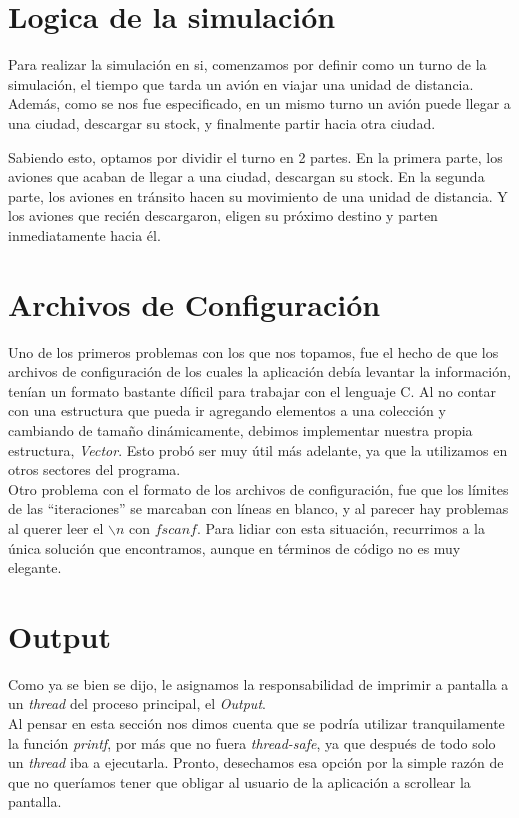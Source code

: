\documentclass[a4paper,10pt]{article}
\begin{document}
\newpage
\section{Logica de la simulación}
Para realizar la simulación en si, comenzamos por definir como un turno de la simulación, el tiempo que tarda un avión en viajar una unidad de distancia.
Además, como se nos fue especificado, en un mismo turno un avión puede llegar a una ciudad, descargar su stock, y finalmente partir hacia otra ciudad.

Sabiendo esto, optamos por dividir el turno en 2 partes.
En la primera parte, los aviones que acaban de llegar a una ciudad, descargan su stock.
En la segunda parte, los aviones en tránsito hacen su movimiento de una unidad de distancia.
Y los aviones que recién descargaron, eligen su próximo destino y parten inmediatamente hacia él.

\newpage
\section{Archivos de Configuración}

Uno de los primeros problemas con los que nos topamos, fue el hecho de que los archivos de configuración de los cuales la aplicación debía levantar la información,
 tenían un formato bastante díficil para trabajar con el lenguaje C. Al no contar con una estructura que pueda ir agregando elementos a una colección y cambiando 
de tamaño dinámicamente, debimos implementar nuestra propia estructura, \textit{Vector}. Esto probó ser muy útil más adelante, ya que la utilizamos en otros sectores 
del programa.\\

Otro problema con el formato de los archivos de configuración, fue que los límites de las ``iteraciones'' se marcaban con líneas en blanco, y al parecer hay 
problemas al querer leer el $\backslash n$ con $fscanf$. Para lidiar con esta situación, recurrimos a la única solución que encontramos, aunque en términos de 
código no es muy elegante.\\

\newpage
\section{Output}

Como ya se bien se dijo, le asignamos la responsabilidad de imprimir a pantalla a un \textit{thread} del proceso principal, el \textit{Output}. \\
Al pensar en esta sección nos dimos cuenta que se podría utilizar tranquilamente la función \textit{printf}, por más que no fuera \textit{thread-safe},
 ya que después de todo solo un \textit{thread} iba a ejecutarla. Pronto, desechamos esa opción por la simple razón de que no queríamos tener que obligar al usuario 
de la aplicación a scrollear la pantalla.\\
\end{document}
